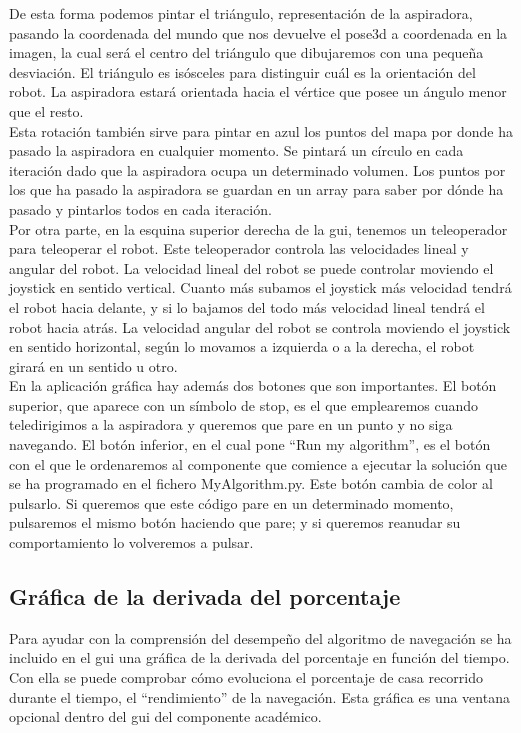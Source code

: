 De esta forma podemos pintar el triángulo, representación de la aspiradora, pasando la coordenada del mundo que nos devuelve el pose3d a coordenada en la imagen, la cual será el centro del triángulo que dibujaremos con una pequeña desviación. El triángulo es isósceles para distinguir cuál es la orientación del robot. La aspiradora estará orientada hacia el vértice que posee un ángulo menor que el resto.\\

Esta rotación también sirve para pintar en azul los puntos del mapa por donde ha pasado la aspiradora en cualquier momento. Se pintará un círculo en cada iteración dado que la aspiradora ocupa un determinado volumen. Los puntos por los que ha pasado la aspiradora se guardan en un array para saber por dónde ha pasado y pintarlos todos en cada iteración.\\

Por otra parte, en la esquina superior derecha de la \acrshort{gui}, tenemos un teleoperador para teleoperar el robot. Este teleoperador controla las velocidades lineal y angular del robot. La velocidad lineal del robot se puede controlar moviendo el joystick en sentido vertical. Cuanto más subamos el joystick más velocidad tendrá el robot hacia delante, y si lo bajamos del todo más velocidad lineal tendrá el robot hacia atrás. La velocidad angular del robot se controla moviendo el joystick en sentido horizontal, según lo movamos a izquierda o a la derecha, el robot girará en un sentido u otro.\\

En la aplicación gráfica hay además dos botones que son importantes. El botón superior, que aparece con un símbolo de stop, es el que emplearemos cuando teledirigimos a la aspiradora y queremos que pare en un punto y no siga navegando. El botón inferior, en el cual pone ``Run my algorithm'', es el botón con el que le ordenaremos al componente que comience a ejecutar la solución que se ha programado en el fichero MyAlgorithm.py. Este botón cambia de color al pulsarlo. Si queremos que este código pare en un determinado momento, pulsaremos el mismo botón haciendo que pare; y si queremos reanudar su comportamiento lo volveremos a pulsar.\\


\subsection{Gráfica de la derivada del porcentaje}
Para ayudar con la comprensión del desempeño del algoritmo de navegación se ha incluido en el \acrshort{gui} una gráfica de la derivada del porcentaje en función del tiempo. Con ella se puede comprobar cómo evoluciona el porcentaje de casa recorrido durante el tiempo, el ``rendimiento'' de la navegación. Esta gráfica es una ventana opcional dentro del \acrshort{gui} del componente académico. \\

